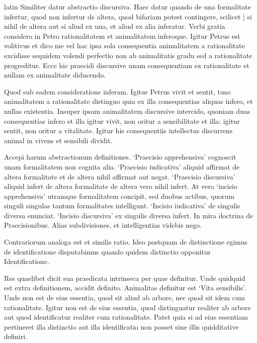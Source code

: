\begin{otherlanguage*}{latin}
\pstart
Similiter datur abstractio discursiva. Haec datur quando de una formalitate infertur, quod non infertur de altera, quod bifariam potest contingere, scilicet \textnormal{|} si nihil de altera aut si aliud ex una, et aliud ex alia inferatur. Verbi gratia considero in Petro rationalitatem et animalitatem inferoque. Igitur Petrus est volitivus et dico me vel hac ipsa sola consequentia animalitatem a rationalitate excidisse sequidem volendi perfectio non ab animalitatis gradu sed a rationalitate progreditur. Ecce hic praecidi discursive unam consequentiam ex rationalitate et nullam ex animalitate diducendo. 
\pend

\pstart
Quod sub eadem consideratione inferam. Igitur Petrus vivit et sentit, tunc animalitatem a rationalitate distinguo quia ex illa consequentias aliquas infero, et nullas existentia. Insuper ipsam animalitatem discursive intercido, quoniam duas consequentias infero et illa igitur vivit, non oritur a sensibilitate et illa:
igitur sentit, non oritur a vitalitate. Igitur his consequentiis intellectus discurrens animal in vivens et sensibili dividit. 
\pend

\pstart
Accepi harum abstractionum definitiones. `Praecisio apprehensiva' cognoscit unam formalitatem non cognita alia. `Praecisio iudicativa' aliquid affirmat de altera formalitate et de altera nihil affirmat aut negat. `Praecisio discursiva' aliquid infert de altera formalitate de altera vero nihil infert. At vero `incisio apprehensiva' utramque formalitatem concipit, sed duobus actibus, quorum singuli singulas tantum formalitates intelligunt. `Incisio iudicativa' de singulis diversa enunciat. `Incisio discursiva' ex singulis diversa infert. In mira doctrina de Praecisionibus. Alias subdivisiones, et intelligentias videbis nego. 
\pend

\pstart
{}
\pend

\pstart
Contrariorum analoga est et similis ratio. Ideo postquam de distinctione egimus de identificatione disputabimus quando quidem distinctio opponitur Identificatione. 
\pend

\pstart
Res quaelibet dicit sua praedicata intrinseca per quae definitur. Unde quidquid est extra definitionem, accidit definito. Animalitas definitur est `Vita sensibilis'. Unde non est de eius essentia, quod sit aliud ab arbore, nec quod sit idem cum rationalitate. Igitur non est de eius essentia, quod distinguatur realiter ab arbore aut quod identificatur realiter cum rationalitate. Patet quia si ad eius essentiam pertineret illa distinctio aut illa identificatio non posset sine illis quidditative definiri. 
\pend


\end{otherlanguage*}
